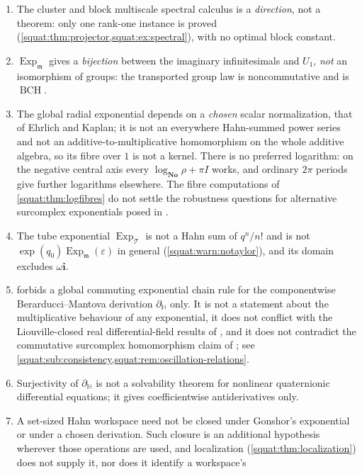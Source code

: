\documentclass[11pt,letterpaper]{article}
\numberwithin{equation}{section}
\theoremstyle{definition}
\theoremstyle{remark}
\newcommand{\No}{\mathbf{No}}
\newcommand{\mm}{\mathfrak m}
\newcommand{\eps}{\varepsilon}
\newcommand{\ii}{\mathbf i}
\newcommand{\Exp}{\operatorname{Exp}}
\newcommand{\Expm}{\Exp_{\mm}}
\newcommand{\Expt}{\Exp_{\mathcal T}}
\newcommand{\BCH}{\operatorname{BCH}}
\newcommand{\dH}{\partial_{\mathbb H}}
\begin{document}
\begin{enumerate}[label=\textup{(N\arabic*)},leftmargin=3.2em]
\cref{squat:eq:valuation-product}, valid for individual nonzero quaternions, must not be
copied to matrices.
\item\label{squat:nc:cluster} The cluster and block multiscale spectral calculus is a
\emph{direction}, not a theorem: only one rank-one instance is proved
(\cref{squat:thm:projector,squat:ex:spectral}), with no optimal block constant.
\item\label{squat:nc:expmnotiso} $\Expm$ gives a \emph{bijection} between the imaginary
infinitesimals and $U_1$, \emph{not} an isomorphism of groups: the transported group law is
noncommutative and is $\BCH$.
\item\label{squat:nc:globalexp} The global radial exponential depends on a \emph{chosen}
scalar normalization, that of Ehrlich and Kaplan; it is not an everywhere Hahn-summed power
series and not an additive-to-multiplicative homomorphism on the whole additive algebra, so
its fibre over $1$ is not a kernel. There is no preferred logarithm: on the negative
central axis every $\log_{\No}\rho+\pi I$ works, and ordinary $2\pi$ periods give further
logarithms elsewhere. The fibre computations of \cref{squat:thm:logfibres} do not settle the
robustness questions for alternative surcomplex exponentials posed in \cite{EK}.
\item\label{squat:nc:tube} The tube exponential $\Expt$ is not a Hahn sum of $q^n/n!$ and
is not $\exp(q_0)\Expm(\eps)$ in general (\cref{squat:warn:notaylor}), and its domain
excludes $\omega\ii$.
\item\label{squat:nc:chainrule}  forbids a global commuting
exponential chain rule for the componentwise Berarducci--Mantova derivation $\dH$ only. It
is not a statement about the multiplicative behaviour of any exponential, it does not
conflict with the Liouville-closed real differential-field results of \cite{BM}, and it does
not contradict the commutative surcomplex homomorphism claim of \cite{RepoPhys}; see
\cref{squat:sub:consistency,squat:rem:oscillation-relations}.
\item\label{squat:nc:bmsurjective} Surjectivity of $\dH$ is not a solvability theorem for
nonlinear quaternionic differential equations; it gives coefficientwise antiderivatives
only.
\item\label{squat:nc:workspaceclosure} A set-sized Hahn workspace need not be closed under
Gonshor's exponential or under a chosen derivation. Such closure is an additional
hypothesis wherever those operations are used, and localization
(\cref{squat:thm:localization}) does not supply it, nor does it identify a workspace's

\end{enumerate}
\end{document}
